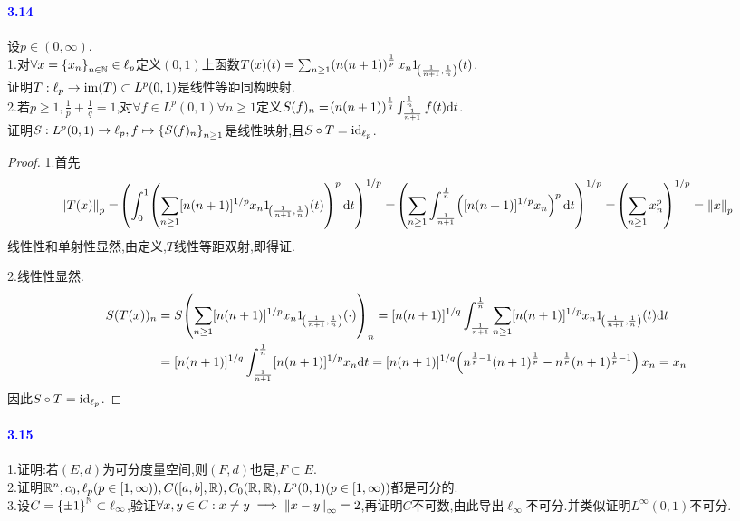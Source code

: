 \documentclass[UTF8]{article}
\newcommand{\parablue}[1]{\paragraph*{\textcolor{blue}{#1}}}
\begin{document}
\parablue{3.14}设$p\in (0,\infty)$.\\
1.对$\forall x=\left\{x_n\right\}_{n\in \mathbb{N}}\in \ell_p$定义$(0,1)$上函数$T(x)(t)=\sum_{n\geq 1}\!\left(n(n+1)\right)^{\frac{1}{p}}x_n1_{\!\left(\frac{1}{n+1},\frac{1}{n}\right)}(t)$.\\
证明$T:\ell_p\to \operatorname{im}(T)\subset L^p(0,1)$是线性等距同构映射.\\
2.若$p\geq 1, \frac{1}{p}+\frac{1}{q}=1$,对$\forall f\in L^p(0,1)\forall n\geq 1$定义$S(f)_n=\!\left(n(n+1)\right)^{\frac{1}{q}}\int_{\frac{1}{n+1}}^{\frac{1}{n}}f(t)\mathrm{d} t$.\\
证明$S:L^p(0,1)\to \ell_p,f\mapsto \left\{S(f)_n\right\}_{n\geq 1}$是线性映射,且$S\circ T=\mathrm{id}_{\ell_p}$.

\begin{proof}
    1.首先$$\left\|T(x)\right\|_p=\!\left(\int_0^1\!\left(\sum_{n\geq 1}[n(n+1)]^{1/p}x_n1_{\!\left(\frac{1}{n+1},\frac{1}{n}\right)}(t)\right)^p\mathrm{d} t\right)^{1/p}=\!\left(\sum_{n\geq 1}\int_{\frac{1}{n+1}}^{\frac{1}{n}}\!\left([n(n+1)]^{1/p}x_n\right)^p\mathrm{d} t\right)^{1/p}=\!\left(\sum_{n\geq 1}x_n^p\right)^{1/p}=\left\|x\right\|_p$$
    线性性和单射性显然,由定义,$T$线性等距双射,即得证.

    2.线性性显然.$$\begin{aligned}
        S(T(x))_n&=S\!\left(\sum_{n\geq 1}[n(n+1)]^{1/p}x_n1_{\!\left(\frac{1}{n+1},\frac{1}{n}\right)}(\cdot)\right)_n=[n(n+1)]^{1/q}\int_{\frac{1}{n+1}}^{\frac{1}{n}}\sum_{n\geq 1}[n(n+1)]^{1/p}x_n1_{\!\left(\frac{1}{n+1},\frac{1}{n}\right)}(t)\mathrm{d} t\\
        &=[n(n+1)]^{1/q}\int_{\frac{1}{n+1}}^{\frac{1}{n}}[n(n+1)]^{1/p}x_n\mathrm{d} t=[n(n+1)]^{1/q}\!\left(n^{\frac{1}{p}-1}(n+1)^{\frac{1}{p}}-n^{\frac{1}{p}}(n+1)^{\frac{1}{p}-1}\right)x_n=x_n
    \end{aligned}$$
    因此$S\circ T=\mathrm{id}_{\ell_p}$.
\end{proof}

\parablue{3.15}1.证明:若$(E,d)$为可分度量空间,则$(F,d)$也是,$F\subset E$.\\
2.证明$\mathbb{R}^n,c_0,\ell_p(p\in \left[1,\infty\right)),C([a,b],\mathbb{R}),C_0(\mathbb{R},\mathbb{R}),L^p(0,1)(p\in \left[1,\infty\right))$都是可分的.\\
3.设$C=\left\{\pm 1\right\}^{\mathbb{N}}\subset \ell_\infty$,验证$\forall x,y\in C:x\neq y\implies \left\|x-y\right\|_\infty=2$,再证明$C$不可数,由此导出$\ell_\infty$不可分.并类似证明$L^\infty(0,1)$不可分.
\end{document}
